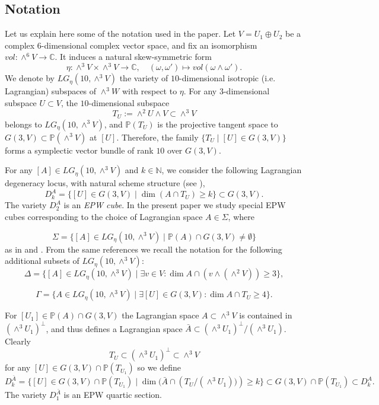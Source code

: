 \documentclass[a4paper,11pt]{amsart}
\theoremstyle{definition}
\numberwithin{equation}{section}
\numberwithin{equation}{section} \theoremstyle{definition}
\begin{document}
\subsection{Notation}\label{notation}
Let us explain here some of the notation used in the paper. 
 Let   $V=U_1\oplus U_2$  be a complex $6$-dimensional complex vector space, and
 fix an isomorphism  $vol: \wedge^6 V \to \mathbb{C}$. 
It induces a natural skew-symmetric form
\begin{equation}\label{def of eta1}\textstyle 
\eta: \wedge^3V\times \wedge^3 V\to \mathbb{C}, \quad (\omega,\omega')\mapsto vol(\omega\wedge \omega').
 \end{equation} 
 We denote by $LG_\eta(10, \wedge^3V)$ the variety of $10$-dimensional isotropic (i.e. Lagrangian) subspaces of $\wedge^3W$ with respect to $\eta$.
 For any $3$-dimensional subspace $U\subset V$, the $10$-dimensional subspace 
 \[\textstyle 
 T_U:=\wedge^2U\wedge V\subset \wedge^3V
 \]
 belongs to $LG_\eta(10, \wedge^3V)$, and ${{\mathbb{P}}}(T_U)$ is the projective tangent space to $G(3,V)\subset {{\mathbb{P}}}(\wedge^3 V)$ at $[U]$.
 Therefore, the family $\{T_U\;|\; [U]\in G(3,V)\}$ forms a symplectic vector bundle of rank $10$ over $G(3,V)$.
 
 For any  $[A]\in LG_\eta(10, \wedge^3V)$ and $k\in \mathbb{N}$, 
 we consider the following Lagrangian degeneracy locus, with natural scheme structure (see \cite{PragaczRatajski}),
 \[
 D_k^A=\{[U]\in G(3,V)\;|\; \dim (A\cap T_U)\geq k\}\subset G(3,V).
 \]
The variety $D_2^A$ is an {\it EPW cube}.
In the present paper we study special EPW cubes corresponding to the choice of Lagrangian space $A\in \Sigma$, where 

$$\Sigma =\{ [A]\in LG_\eta(10,\wedge^3V)\;|\;  {{\mathbb{P}}}(A)\cap G(3,V)\not=\emptyset \}$$ 
as in  \cite{Ogrady-michigan} and \cite{EPWcubes}.  From the same references we recall the notation for the following additional subsets of $LG_\eta(10,\wedge^3V)$:
 $$\Delta=\{ [A]\in LG_\eta(10,\wedge^3V)\;|\;  \exists v\in V \colon \dim A\cap (v\wedge(\wedge^2 V))\geq 3 \}, $$

$$\Gamma= \{A\in LG_\eta(10,\wedge^3V)\;|\;  \exists [U]\in G(3,V) \colon \dim A\cap T_U\geq 4\}.$$ 

 For $[U_1]\in  {{\mathbb{P}}}(A)\cap G(3,V)$ the Lagrangian space $A\subset \wedge^3V$ is contained in $(\wedge^3U_1)^{\bot}$, and thus defines a Lagrangian space $\bar{A}\subset (\wedge^3U_1)^{\bot}/ (\wedge^3{U_1})$.  Clearly  
 \[
 T_{U}\subset (\wedge^3U_1)^{\bot}\subset \wedge^3V 
 \]
  for any $[U]\in G(3,V)\cap {{\mathbb{P}}}(T_{U_1})$ so we define 
 \[
 D_k^{\bar{A}}=\{[U]\in G(3,V)\cap {{\mathbb{P}}}(T_{U_1})\;|\; \dim (\bar{A}\cap (T_{U}/{(\wedge^3U_1))})\geq k\}\subset G(3,V)\cap{{\mathbb{P}}}(T_{U_1})\subset D_k^A.
 \] 
  The variety $D_1^{\bar{A}}$ is an EPW quartic section.
\end{document}
